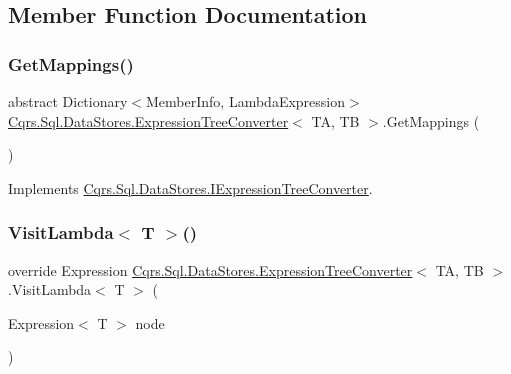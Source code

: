 \subsection{Member Function Documentation}
\mbox{\label{classCqrs_1_1Sql_1_1DataStores_1_1ExpressionTreeConverter_abd0d906a5b8abd8520874104d3bfcad0}} 
\subsubsection{\texorpdfstring{Get\+Mappings()}{GetMappings()}}
{\footnotesize\ttfamily abstract Dictionary$<$Member\+Info, Lambda\+Expression$>$ \hyperlink{classCqrs_1_1Sql_1_1DataStores_1_1ExpressionTreeConverter}{Cqrs.\+Sql.\+Data\+Stores.\+Expression\+Tree\+Converter}$<$ TA, TB $>$.Get\+Mappings (\begin{DoxyParamCaption}{ }\end{DoxyParamCaption})\hspace{0.3cm}{\ttfamily [pure virtual]}}



Implements \hyperlink{interfaceCqrs_1_1Sql_1_1DataStores_1_1IExpressionTreeConverter_ad48480ecf7056a2b2cc079006cc2a589}{Cqrs.\+Sql.\+Data\+Stores.\+I\+Expression\+Tree\+Converter}.

\mbox{\label{classCqrs_1_1Sql_1_1DataStores_1_1ExpressionTreeConverter_abf97079f29447cd8e0bcfab91891ccb9}} 
\subsubsection{\texorpdfstring{Visit\+Lambda$<$ T $>$()}{VisitLambda< T >()}}
{\footnotesize\ttfamily override Expression \hyperlink{classCqrs_1_1Sql_1_1DataStores_1_1ExpressionTreeConverter}{Cqrs.\+Sql.\+Data\+Stores.\+Expression\+Tree\+Converter}$<$ TA, TB $>$.Visit\+Lambda$<$ T $>$ (\begin{DoxyParamCaption}\item[{Expression$<$ T $>$}]{node }\end{DoxyParamCaption})\hspace{0.3cm}{\ttfamily [protected]}}

